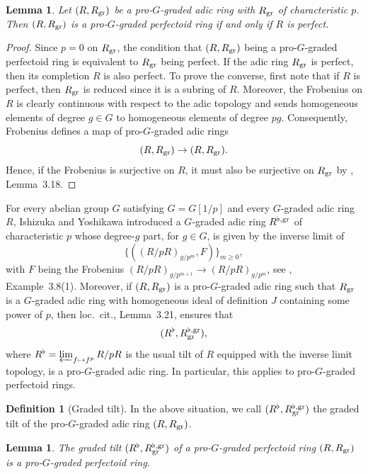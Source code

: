 \documentclass[12pt,twoside,a4paper]{article}
\newtheorem{lemma}[thm]{Lemma}
\theoremstyle{definition}
\newtheorem{mydef}[thm]{Definition}
\theoremstyle{remark}
\newcommand\gr{{\rm gr}}
\begin{document}
\begin{lemma}\label{Perfect}Let $(R, R_{\gr})$ be a pro-$G$-graded adic ring with $R_{\gr}$ of characteristic $p$. Then $(R, R_{\gr})$ is a pro-$G$-graded perfectoid ring if and only if $R$ is perfect. \end{lemma}
\begin{proof}Since $p=0$ on $R_{\gr}$, the condition that $(R, R_{\gr})$ being a pro-$G$-graded perfectoid ring is equivalent to $R_{\gr}$ being perfect. If the adic ring $R_{\gr}$ is perfect, then its completion $R$ is also perfect. To prove the converse, first note that if $R$ is perfect, then $R_{\gr}$ is reduced since it is a subring of $R$. Moreover, the Frobenius on $R$ is clearly continuous with respect to the adic topology and sends homogeneous elements of degree $g\in G$ to homogeneous elements of degree $pg$. Consequently, Frobenius defines a map of pro-$G$-graded adic rings \begin{equation*}(R, R_{\gr})\to (R, R_{\gr}).\end{equation*}Hence, if the Frobenius is surjective on $R$, it must also be surjective on $R_{\gr}$ by \cite{Ishizuka-Yoshikawa25}, Lemma~3.18. \end{proof}
For every abelian group $G$ satisfying $G=G[1/p]$ and every $G$-graded adic ring $R$, Ishizuka and Yoshikawa introduced a $G$-graded adic ring $R^{\flat,\gr}$ of characteristic $p$ whose degree-$g$ part, for $g\in G$, is given by the inverse limit of \begin{equation*}\{((R/pR)_{g/p^{m}}, F)\}_{m\geq0},\end{equation*}with $F$ being the Frobenius $(R/pR)_{g/p^{m+1}}\to (R/pR)_{g/p^{m}}$, see \cite{Ishizuka-Yoshikawa25}, Example~3.8(1). Moreover, if $(R, R_{\gr})$ is a pro-$G$-graded adic ring such that $R_{\gr}$ is a $G$-graded adic ring with homogeneous ideal of definition $J$ containing some power of $p$, then loc.~cit., Lemma~3.21, ensures that \begin{equation*}(R^{\flat}, R_{\gr}^{\flat,\gr}),\end{equation*}where $R^{\flat}=\varprojlim_{f\mapsto f^{p}}R/pR$ is the usual tilt of $R$ equipped with the inverse limit topology, is a pro-$G$-graded adic ring. In particular, this applies to pro-$G$-graded perfectoid rings. 
\begin{mydef}[Graded tilt]In the above situation, we call $(R^{\flat}, R_{\gr}^{\flat,\gr})$ the graded tilt of the pro-$G$-graded adic ring $(R, R_{\gr})$.\end{mydef}
\begin{lemma}\label{Graded tilt is perfectoid}The graded tilt $(R^{\flat}, R_{\gr}^{\flat,\gr})$ of a pro-$G$-graded perfectoid ring $(R, R_{\gr})$ is a pro-$G$-graded perfectoid ring. \end{lemma}
\end{document}
